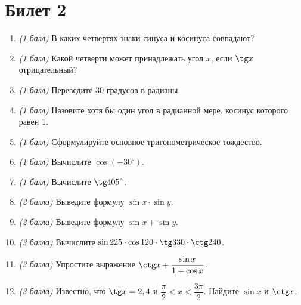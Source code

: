\documentclass[12pt, a4paper]{article}
\begin{document}
	\section*{Билет 2}
	\begin{enumerate}
		\item \textit{(1 балл)} В каких четвертях знаки синуса и косинуса совпадают?
		\item \textit{(1 балл)} Какой четверти может принадлежать угол $x$, если $\tg x$ отрицательный?
		\item \textit{(1 балл)} Переведите 30 градусов в радианы.
		\item \textit{(1 балл)} Назовите хотя бы один угол в радианной мере, косинус которого равен 1.
		\item \textit{(1 балл)} Сформулируйте основное тригонометрическое тождество.
		\item \textit{(1 балл)} Вычислите $\cos (-30^{\circ})$.
		\item \textit{(1 балл)} Вычислите $\tg 405^{\circ}$.
		\item \textit{(2 балла)} Выведите формулу $\sin x \cdot \sin y$.
		\item \textit{(2 балла)} Выведите формулу $\sin x + \sin y$.
		\item \textit{(3 балла)} Вычислите $\sin 225 \cdot \cos 120  \cdot \tg 330 \cdot \ctg 240$.
		\item \textit{(3 балла)} Упростите выражение $\ctg x + \dfrac{\sin x}{1+\cos x}$.
		\item \textit{(3 балла)} Известно, что $\tg x = 2,4$ и $\dfrac{\pi}{2}<x<\dfrac{3\pi}{2}$. Найдите $\sin x$ и $\ctg x$.
	\end{enumerate}

\newpage 
\end{document}
